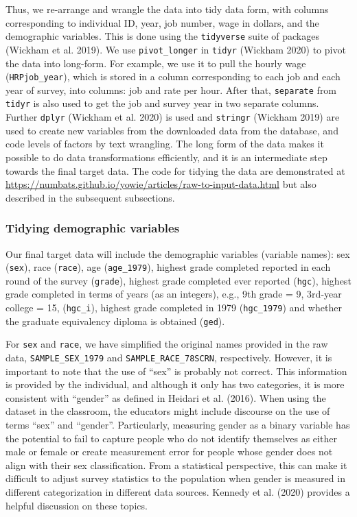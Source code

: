 \documentclass{article}
\begin{document}
Thus, we re-arrange and wrangle the data into tidy data form, with columns corresponding to individual ID, year, job number, wage in dollars, and the demographic variables. This is done using the \texttt{tidyverse} suite of packages (Wickham et al. 2019). We use \texttt{pivot\_longer} in \texttt{tidyr} (Wickham 2020) to pivot the data into long-form. For example, we use it to pull the hourly wage (\texttt{HRPjob\_year}), which is stored in a column corresponding to each job and each year of survey, into columns: job and rate per hour. After that, \texttt{separate} from \texttt{tidyr} is also used to get the job and survey year in two separate columns. Further \texttt{dplyr} (Wickham et al. 2020) is used and \texttt{stringr} (Wickham 2019) are used to create new variables from the downloaded data from the database, and code levels of factors by text wrangling. The long form of the data makes it possible to do data transformations efficiently, and it is an intermediate step towards the final target data. The code for tidying the data are demonstrated at \url{https://numbats.github.io/yowie/articles/raw-to-input-data.html} but also described in the subsequent subsections.

\hypertarget{tidydemog}{%
\subsubsection{Tidying demographic variables}\label{tidydemog}}

Our final target data will include the demographic variables (variable names): sex (\texttt{sex}), race (\texttt{race}), age (\texttt{age\_1979}), highest grade completed reported in each round of the survey (\texttt{grade}), highest grade completed ever reported (\texttt{hgc}), highest grade completed in terms of years (as an integers), e.g., 9th grade = 9, 3rd-year college = 15, (\texttt{hgc\_i}), highest grade completed in 1979 (\texttt{hgc\_1979}) and whether the graduate equivalency diploma is obtained (\texttt{ged}).

For \texttt{sex} and \texttt{race}, we have simplified the original names provided in the raw data, \texttt{SAMPLE\_SEX\_1979} and \texttt{SAMPLE\_RACE\_78SCRN}, respectively. However, it is important to note that the use of ``sex'' is probably not correct. This information is provided by the individual, and although it only has two categories, it is more consistent with ``gender'' as defined in Heidari et al. (2016). When using the dataset in the classroom, the educators might include discourse on the use of terms ``sex'' and ``gender''. Particularly, measuring gender as a binary variable has the potential to fail to capture people who do not identify themselves as either male or female or create measurement error for people whose gender does not align with their sex classification. From a statistical perspective, this can make it difficult to adjust survey statistics to the population when gender is measured in different categorization in different data sources. Kennedy et al. (2020) provides a helpful discussion on these topics.
\end{document}
